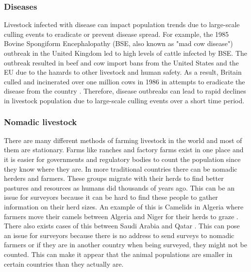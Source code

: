 \documentclass{article}
\begin{document}
\subsubsection{Diseases}
Livestock infected with disease can impact population trends due to large-scale culling events to eradicate or prevent disease spread. For example, the 1985 Bovine Spongiform Encephalopathy (BSE, also known as "mad cow disease") outbreak in the United Kingdom led to high levels of cattle infected by BSE. The outbreak resulted in beef and cow import bans from the United States and the EU due to the hazards to other livestock and human safety. As a result, Britain culled and incinerated over one million cows in 1986 in attempts to eradicate the disease from the country \citep{cnn_eu_nodate}. Therefore, disease outbreaks can lead to rapid declines in livestock population due to large-scale culling events over a short time period.

\subsubsection{Nomadic livestock}
There are many different methods of farming livestock in the world and most of them are stationary. Farms like ranches and factory farms exist in one place and it is easier for governments and regulatory bodies to count the population since they know where they are. In more traditional countries there can be nomadic herders and farmers. These groups migrate with their herds to find better pastures and resources as humans did thousands of years ago. This can be an issue for surveyors because it can be hard to find these people to gather information on their herd sizes. An example of this is Camelids in Algeria where farmers move their camels between Algeria and Niger for their herds to graze \citep{faye_how_2020}. There also exists cases of this between Saudi Arabia and Qatar \citep{faye_how_2020}. This can pose an issue for surveyors because there is no address to send surveys to nomadic farmers or if they are in another country when being surveyed, they might not be counted. This can make it appear that the animal populations are smaller in certain countries than they actually are. 
\end{document}
